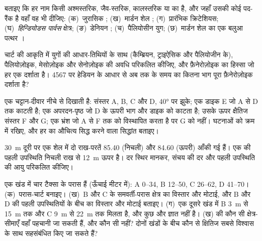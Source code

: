 \begin{exercise}[$\star$]\label{exo:b1:stratigraphic-scale:1}
बताइए कि हर नाम किसी अश्मस्तरिक, जैव-स्तरिक, कालस्तरिक या  का है, और जहाँ उसकी कोई पद-रैंक है वहाँ वह भी दीजिए: (क)~जुरासिक ; (ख)~मार्डन शेल ; (ग)~प्रारंभिक क्रिटेशियस; (घ)~\emph{हिन्डियोडस पार्वस} क्षेत्र; (ङ)~डेनियन ; (च)~पैलियोसीन युग; (छ)~मार्डन शेल का एक बलुआ पत्थर ।
\end{exercise}

\begin{exercise}[$\star$]\label{exo:b1:stratigraphic-scale:2}
चार्ट की आकृति में युगों की आधार-तिथियों के साथ (कैम्ब्रियन, ट्राइऐसिक और पैलियोजीन के), पैलियोज़ोइक, मेसोज़ोइक और सेनोज़ोइक की अवधि परिकलित कीजिए, और फ़ैनेरोज़ोइक का हिस्सा जो हर एक दर्शाता है। \qty{4567}{\Ma} पर हेडियन के आधार से अब तक के समय का कितना भाग पूरा फ़ैनेरोज़ोइक दर्शाता है?
\end{exercise}

\begin{exercise}[$\star$]\label{exo:b1:stratigraphic-scale:3}
एक चट्टान-दीवार नीचे से दिखाती है: संस्तर A, B, C और D, \ang{40} पर झुके; एक डाइक E जो A से D तक काटती है; एक अपरदन-पृष्ठ जो D के ऊपरी भाग और डाइक को काटता है; उसके ऊपर क्षैतिज संस्तर F और G; एक भ्रंश जो A से F तक को विस्थापित करता है पर G को नहीं। घटनाओं को क्रम में रखिए, और हर  का औचित्य सिद्ध करने वाला सिद्धांत बताइए।
\end{exercise}

\begin{exercise}[$\star$]\label{exo:b1:stratigraphic-scale:4}
\qty{30}{m} दूरी पर एक शेल में दो राख-परतें \qty{85.40}{\Ma} (निचली) और \qty{84.60}{\Ma} (ऊपरी) आँकी गई हैं। एक  की पहली उपस्थिति निचली राख से \qty{12}{m} ऊपर है। दर स्थिर मानकर, संचय की दर और पहली उपस्थिति की आयु परिकलित कीजिए।
\end{exercise}

\begin{exercise}[$\star\star$]\label{exo:b1:stratigraphic-scale:5}
एक खंड में चार टैक्सा के परास हैं (ऊँचाई मीटर में): A 0--34, B 12--50, C 26--62, D 41--70। (क)~परास-चार्ट बनाइए। (ख)~B और C के समवर्ती-परास क्षेत्र का विस्तार और मोटाई, और B और D की पहली उपस्थितियों के बीच  का विस्तार और मोटाई बताइए। (ग)~एक दूसरे खंड में B \qty{3}{m} से \qty{15}{m} तक और C \qty{9}{m} से \qty{22}{m} तक मिलता है, और कुछ और ज्ञात नहीं है। (ख) की कौन सी क्षेत्र-सीमाएँ वहाँ पहचानी जा सकती हैं, और कौन सी नहीं? दोनों खंडों के बीच कौन से क्षितिज सबसे विश्वास के साथ सहसंबंधित किए जा सकते हैं?
\end{exercise}

